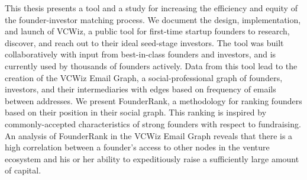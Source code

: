 %
%
%
This thesis presents a tool and a study for increasing the efficiency and equity of the founder-investor matching process. We document the design, implementation, and launch of VCWiz, a public tool for first-time startup founders to research, discover, and reach out to their ideal seed-stage investors. The tool was built collaboratively with input from best-in-class founders and investors, and is currently used by thousands of founders actively. Data from this tool lead to the creation of the VCWiz Email Graph, a social-professional graph of founders, investors, and their intermediaries with edges based on frequency of emails between addresses. We present FounderRank, a methodology for ranking founders based on their position in their social graph. This ranking is inspired by commonly-accepted characteristics of strong founders with respect to fundraising. An analysis of FounderRank in the VCWiz Email Graph reveals that there is a high correlation between a founder's access to other nodes in the venture ecosystem and his or her ability to expeditiously raise a sufficiently large amount of capital.
